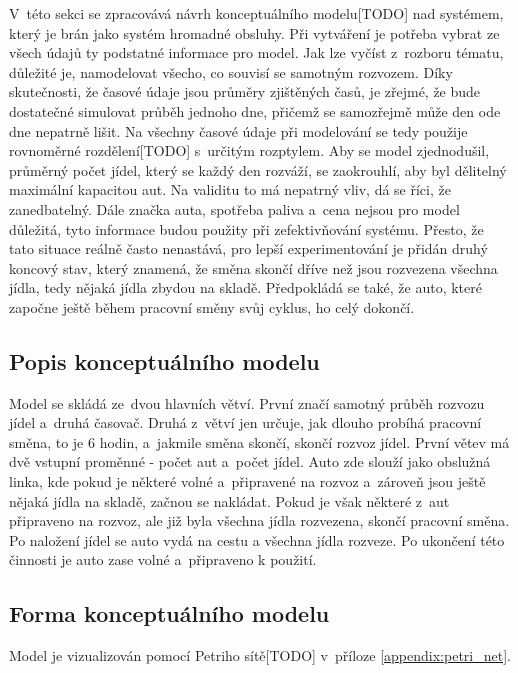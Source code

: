 \documentclass[a4paper, 11pt]{article}
\begin{document}
	V~této sekci se zpracovává návrh konceptuálního modelu[TODO] nad
	systémem, který je brán jako systém hromadné obsluhy. Při vytváření
	je potřeba vybrat ze všech údajů ty podstatné informace pro model. Jak lze
	vyčíst z~rozboru tématu, důležité je, namodelovat všecho, co souvisí
	se samotným rozvozem. Díky skutečnosti, že časové údaje jsou průměry
	zjištěných časů, je zřejmé, že bude dostatečné simulovat průběh
	jednoho dne, přičemž se samozřejmě může den ode dne nepatrně lišit.
	Na všechny časové údaje při modelování se tedy použije rovnoměrné
	rozdělení[TODO] s~určitým rozptylem. Aby se model zjednodušil,
	průměrný počet jídel, který se každý den rozváží, se zaokrouhlí,
	aby byl dělitelný maximální kapacitou aut. Na validitu to má nepatrný
	vliv, dá se říci, že zanedbatelný. Dále značka auta, spotřeba paliva
	a~cena nejsou pro model důležitá, tyto informace budou použity při
	zefektivňování systému. Přesto, že tato situace reálně často nenastává,
	pro lepší experimentování je přidán druhý koncový stav, který znamená,
	že směna skončí dříve než jsou rozvezena všechna jídla, tedy nějaká
	jídla zbydou na skladě. Předpokládá se také, že auto, které započne
	ještě během pracovní směny svůj cyklus, ho celý dokončí.


	\subsection{Popis konceptuálního modelu}

	Model se skládá ze~dvou hlavních větví. První značí samotný průběh
	rozvozu jídel a~druhá časovač. Druhá z~větví jen určuje, jak dlouho
	probíhá pracovní směna, to je 6 hodin, a~jakmile směna skončí, skončí
	rozvoz jídel. První větev má dvě vstupní proměnné - počet aut a~počet
	jídel. Auto zde slouží jako obslužná linka, kde pokud je některé volné
	a~připravené na rozvoz a~zároveň jsou ještě nějaká jídla na skladě,
	začnou se nakládat. Pokud je však některé z~aut připraveno na rozvoz,
	ale již byla všechna jídla rozvezena, skončí pracovní směna. Po
	naložení jídel se auto vydá na cestu a všechna jídla rozveze. Po ukončení
	této činnosti je auto zase volné a~připraveno k použití.


	\subsection{Forma konceptuálního modelu}

	Model je vizualizován pomocí Petriho sítě[TODO] v~příloze
	\ref{appendix:petri_net}.
\end{document}
